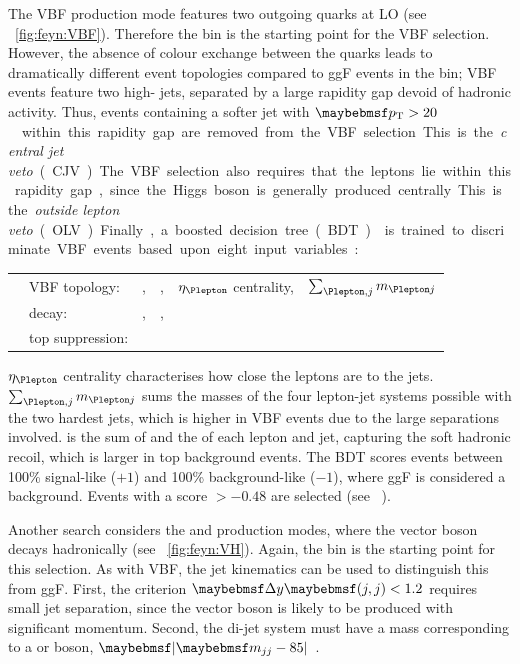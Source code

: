 The VBF production mode features two outgoing quarks at LO (see 
\Figure~\ref{fig:feyn:VBF}). 
Therefore the \twojet bin is the starting point for the VBF selection. However, the 
absence of colour exchange between the quarks leads to dramatically different event 
topologies compared to ggF events in the \twojet bin; VBF events feature two high-\pt 
jets, separated by a large rapidity gap devoid of hadronic activity. Thus, events 
containing a softer jet with \unit{$\pt > 20$}{\GeV} within this rapidity gap are removed 
from the VBF selection. This is the \textit{central jet veto} (CJV). The VBF selection 
also requires that the leptons lie within this rapidity gap, since the Higgs boson is 
generally produced centrally. This is the \textit{outside lepton veto} (OLV). Finally, a 
boosted decision tree (BDT) \cite{TMVA} is trained to discriminate VBF events based upon 
eight input variables:

\begin{listliketab}
	\begin{tabular}{Ll@{\hskip 0.3in}llll}
		\textbullet & VBF topology:    & \mjj, &\dyjj, &$\eta_{\Plepton}$ centrality, &$\sum_{\Plepton, j} m_{\Plepton j}$ \\
		\textbullet & \HWW decay:      & \mll, &\dphill, &\mt \\
		\textbullet & top suppression: & \pttot \\
	\end{tabular}
\end{listliketab}

\noindent
$\eta_{\Plepton}$ centrality characterises how close the leptons are to the jets. 
$\sum_{\Plepton, j} m_{\Plepton j}$ sums the masses of the four lepton-jet systems 
possible with the two hardest jets, which is higher in VBF events due to the large 
separations involved. \pttot is the sum of \corrtrackmetvec and the \ptvec of each lepton 
and jet, capturing the soft hadronic recoil, which is larger in top background events. 
The BDT scores events between 100\% signal-like ($+1$) and 100\% background-like ($-1$), 
where ggF is considered a background. Events with a score $> -0.48$ are selected (see 
\Figure~).

Another search considers the \WH and \ZH production modes, where the vector boson decays 
hadronically (see \Figure~\ref{fig:feyn:VH}). Again, the \twojet bin is the starting 
point for this selection. As with VBF, the jet kinematics can be used to distinguish this 
from ggF. First, the criterion $\dyjj < 1.2$ requires small jet separation, since the 
vector boson is likely to be produced with significant momentum. Second, the di-jet 
system must have a mass corresponding to a \PW or \PZ boson, 
\unit{$\mods{\mjj - 85}$}{\GeV}.

